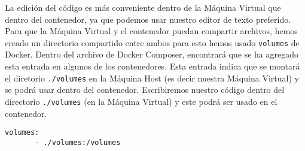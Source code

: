 La edición del código es más conveniente dentro de la Máquina Virtual que dentro del contenedor, ya que podemos usar nuestro editor de texto preferido.
Para que la Máquina Virtual y el contenedor puedan compartir archivos, hemos creado un directorio compartido entre ambos para esto hemos usado \texttt{volumes} de Docker.
Dentro del archivo de Docker Composer, encontrará que se ha agregado esta entrada en algunos de los contenedores.
Esta entrada indica que se montará el diretorio \texttt{./volumes} en la Máquina Host (es decir nuestra Máquina Virtual) y se podrá usar dentro del contenedor.
Escribiremos nuestro código dentro del directorio \texttt{./volumes} (en la Máquina Virtual) y este podrá ser usado en el contenedor.

\begin{lstlisting}
volumes:
       - ./volumes:/volumes
\end{lstlisting}


